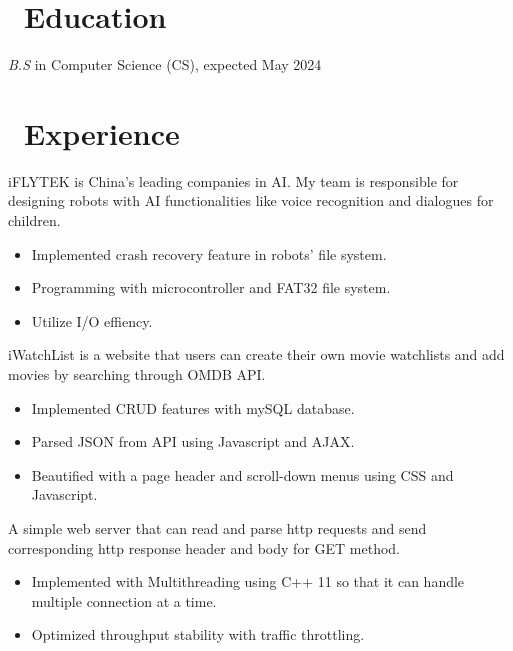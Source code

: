 \documentclass{resume}
\begin{document}



\section{\faGraduationCap\ Education}
\textit{B.S} in Computer Science (CS), expected May 2024

\section{\faUsers\ Experience}
  iFLYTEK is China's leading companies in AI. My team is responsible for designing robots with AI functionalities like voice recognition and dialogues for children.
\begin{itemize}
  \item Implemented crash recovery feature in robots' file system.
  \item Programming with microcontroller and FAT32 file system.
  \item Utilize I/O effiency.
\end{itemize}

  iWatchList is a website that users can create their own movie watchlists and add movies by searching through OMDB API.
\begin{itemize}
  \item Implemented CRUD features with mySQL database.
  \item Parsed JSON from API using Javascript and AJAX.
  \item Beautified with a page header and scroll-down menus using CSS and Javascript.
\end{itemize}

  A simple web server that can read and parse http requests and send corresponding http response header and body for GET method.
\begin{itemize}
  \item Implemented with Multithreading using C++ 11 so that it can handle multiple connection at a time.
  \item Optimized throughput stability with traffic throttling.
\end{itemize}
\end{document}

